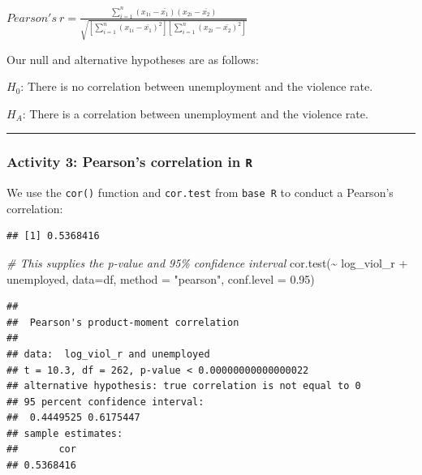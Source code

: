 \documentclass[
]{book}
\newenvironment{Shaded}{\begin{snugshade}}{\end{snugshade}}
\newcommand{\AttributeTok}[1]{\textcolor[rgb]{0.77,0.63,0.00}{#1}}
\newcommand{\CommentTok}[1]{\textcolor[rgb]{0.56,0.35,0.01}{\textit{#1}}}
\newcommand{\FloatTok}[1]{\textcolor[rgb]{0.00,0.00,0.81}{#1}}
\newcommand{\FunctionTok}[1]{\textcolor[rgb]{0.00,0.00,0.00}{#1}}
\newcommand{\NormalTok}[1]{#1}
\newcommand{\SpecialCharTok}[1]{\textcolor[rgb]{0.00,0.00,0.00}{#1}}
\newcommand{\StringTok}[1]{\textcolor[rgb]{0.31,0.60,0.02}{#1}}
\begin{document}
\(Pearson's~ r = \frac{\sum_{i=1}^{n} (x_{1i} - \bar{x_1})(x_{2i} - \bar{x_2})}{\sqrt{[\sum_{i=1}^{n} (x_{1i}- \bar{x_1})^2][\sum_{i=1}^{n} (x_{2i}- \bar{x_2})^2]}}\)

Our null and alternative hypotheses are as follows:

\(H_0\): There is no correlation between unemployment and the violence rate.

\(H_A\): There is a correlation between unemployment and the violence rate.

\begin{center}\rule{0.5\linewidth}{0.5pt}\end{center}

\hypertarget{activity-3-pearsons-correlation-in-r}{%
\subsubsection{\texorpdfstring{Activity 3: Pearson's correlation in \texttt{R}}{Activity 3: Pearson's correlation in R}}\label{activity-3-pearsons-correlation-in-r}}

We use the \texttt{cor()} function and \texttt{cor.test} from \texttt{base\ R} to conduct a Pearson's correlation:

\begin{Shaded}
\end{Shaded}

\begin{verbatim}
## [1] 0.5368416
\end{verbatim}

\begin{Shaded}
\begin{Highlighting}[]
\CommentTok{\# This supplies the p{-}value and 95\% confidence interval}
\FunctionTok{cor.test}\NormalTok{(}\SpecialCharTok{\textasciitilde{}}\NormalTok{ log\_viol\_r }\SpecialCharTok{+}\NormalTok{ unemployed, }\AttributeTok{data=}\NormalTok{df, }\AttributeTok{method =} \StringTok{"pearson"}\NormalTok{, }\AttributeTok{conf.level =} \FloatTok{0.95}\NormalTok{)}
\end{Highlighting}
\end{Shaded}

\begin{verbatim}
## 
##  Pearson's product-moment correlation
## 
## data:  log_viol_r and unemployed
## t = 10.3, df = 262, p-value < 0.00000000000000022
## alternative hypothesis: true correlation is not equal to 0
## 95 percent confidence interval:
##  0.4449525 0.6175447
## sample estimates:
##       cor 
## 0.5368416
\end{verbatim}
\end{document}
